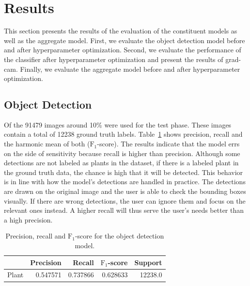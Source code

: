 \documentclass[draft,final]{vutinfth} %
\begin{document}
\section{Results}
\label{sec:results}

This section presents the results of the evaluation of the constituent
models as well as the aggregate model. First, we evaluate the object
detection model before and after hyperparameter optimization. Second,
we evaluate the performance of the classifier after hyperparameter
optimization and present the results of \gls{grad-cam}. Finally, we
evaluate the aggregate model before and after hyperparameter
optimization.

\subsection{Object Detection}
\label{ssec:yolo-eval}

Of the \num{91479} images around 10\% were used for the test
phase. These images contain a total of \num{12238} ground truth
labels. Table~\ref{tab:yolo-metrics} shows precision, recall and the
harmonic mean of both ($\mathrm{F}_1$-score). The results indicate
that the model errs on the side of sensitivity because recall is
higher than precision. Although some detections are not labeled as
plants in the dataset, if there is a labeled plant in the ground truth
data, the chance is high that it will be detected. This behavior is in
line with how the model's detections are handled in practice. The
detections are drawn on the original image and the user is able to
check the bounding boxes visually. If there are wrong detections, the
user can ignore them and focus on the relevant ones instead. A higher
recall will thus serve the user's needs better than a high precision.

\begin{table}[h]
  \centering
  \begin{tabular}{lrrrr}
    \toprule
    {} &  Precision &    Recall &  $\mathrm{F}_1$-score &  Support \\
    \midrule
    Plant        &   \num{0.547571} &  \num{0.737866} &  \num{0.628633} &  \num{12238.0} \\
    \bottomrule
  \end{tabular}
  \caption{Precision, recall and $\mathrm{F}_1$-score for the object
    detection model.}
  \label{tab:yolo-metrics}
\end{table}
\end{document}
